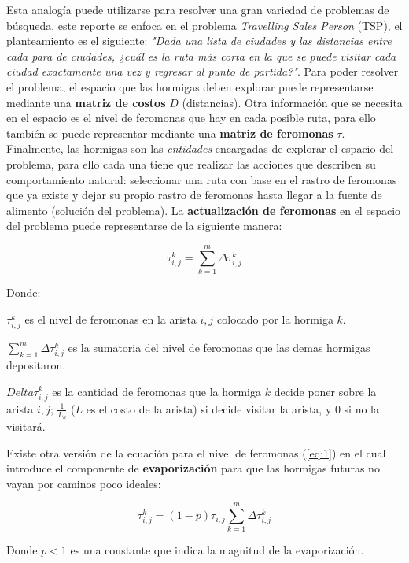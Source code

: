 \documentclass[12pt, a4paper]{article}
\begin{document}
Esta analogía puede utilizarse para resolver una gran variedad de problemas de búsqueda, este reporte se enfoca en el problema \href{https://en.wikipedia.org/wiki/Travelling_salesman_problem}{\emph{Travelling Sales Person}} (TSP), el planteamiento es el siguiente: \emph{"Dada una lista de ciudades y las distancias entre cada para de ciudades, ¿cuál es la ruta más corta en la que se puede visitar cada ciudad exactamente una vez y regresar al punto de partida?"}. Para poder resolver el problema, el espacio que las hormigas deben explorar puede representarse mediante una \textbf{matriz de costos} $D$ (distancias). Otra información que se necesita en el espacio es el nivel de feromonas que hay en cada posible ruta, para ello también se puede representar mediante una \textbf{matriz de feromonas} $\tau$. Finalmente, las hormigas son las \emph{entidades} encargadas de explorar el espacio del problema, para ello cada una tiene que realizar las acciones que describen su comportamiento natural: seleccionar una ruta con base en el rastro de feromonas que ya existe y dejar su propio rastro de feromonas hasta llegar a la fuente de alimento (solución del problema). La \textbf{actualización de feromonas} en el espacio del problema puede representarse de la siguiente manera:

\begin{equation} \label{eq:1}
    \tau_{i,j}^k=\sum_{k=1}^m\Delta\tau_{i,j}^k
\end{equation}

Donde:

$\tau_{i,j}^k$ es el nivel de feromonas en la arista $i,j$ colocado por la hormiga $k$.

$\sum_{k=1}^m\Delta\tau_{i,j}^k$ es la sumatoria del nivel de feromonas que las demas hormigas depositaron.

$Delta\tau_{i,j}^k$ es la cantidad de feromonas que la hormiga $k$ decide poner sobre la arista $i,j$; $\frac{1}{L_k}$ ($L$ es el costo de la arista) si decide visitar la arista, y $0$ si no la visitará.

Existe otra versión de la ecuación para el nivel de feromonas (\ref{eq:1}) en el cual introduce el componente de \textbf{evaporización} para que las hormigas futuras no vayan por caminos poco ideales:

\begin{equation}
    \tau_{i,j}^k=(1-p)\tau_{i,j}\sum_{k=1}^m\Delta\tau_{i,j}^k
\end{equation}

Donde $p<1$ es una constante que indica la magnitud de la evaporización.
\end{document}
